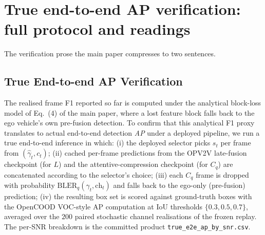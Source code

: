 \documentclass[journal]{IEEEtran}
\begin{document}
\section{True end-to-end AP verification: full protocol and readings}\label{sec:true_e2e_full}
The verification prose the main paper compresses to two sentences.

\subsection{True End-to-end AP Verification}\label{sec:true_e2e}

The realised frame F1 reported so far is computed under the analytical block-loss model of Eq.~(4) of the main paper, where a lost feature block falls back to the ego vehicle's own pre-fusion detection. To confirm that this analytical F1 proxy translates to actual end-to-end detection \emph{AP} under a deployed pipeline, we run a true end-to-end inference in which: (i) the deployed selector picks $s_t$ per frame from $(\hat\gamma_t,c_t)$; (ii) cached per-frame predictions from the OPV2V late-fusion checkpoint (for $L$) and the attentive-compression checkpoint (for $C_q$) are concatenated according to the selector's choice; (iii) each $C_q$ frame is dropped with probability $\mathrm{BLER}_q(\gamma_t,\mathrm{ch}_t)$ and falls back to the ego-only (pre-fusion) prediction; (iv) the resulting box set is scored against ground-truth boxes with the OpenCOOD VOC-style $\mathrm{AP}$ computation at IoU thresholds $\{0.3,0.5,0.7\}$, averaged over the $200$ paired stochastic channel realisations of the frozen replay. The per-SNR breakdown is the committed product \texttt{true\_e2e\_ap\_by\_snr.csv}.
\end{document}
